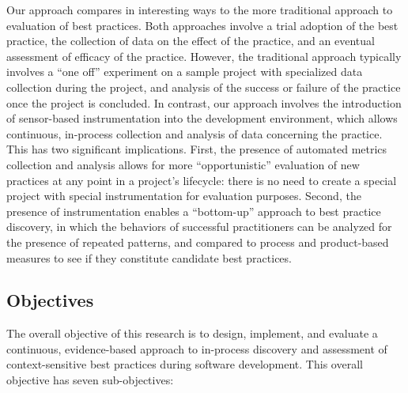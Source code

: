 Our approach compares in interesting ways to the more traditional approach
to evaluation of best practices.  Both approaches involve a trial adoption
of the best practice, the collection of data on the effect of the practice,
and an eventual assessment of efficacy of the practice. However, the
traditional approach typically involves a ``one off'' experiment on a
sample project with specialized data collection during the project, and
analysis of the success or failure of the practice once the project is
concluded.  In contrast, our approach involves the introduction of
sensor-based instrumentation into the development environment, which allows
continuous, in-process collection and analysis of data concerning the
practice.  This has two significant implications. First, the presence of
automated metrics collection and analysis allows for more ``opportunistic''
evaluation of new practices at any point in a project's lifecycle: there is
no need to create a special project with special instrumentation for
evaluation purposes. Second, the presence of instrumentation enables a
``bottom-up'' approach to best practice discovery, in which the behaviors
of successful practitioners can be analyzed for the presence of repeated
patterns, and compared to process and product-based measures to see if they
constitute candidate best practices.

\subsection{Objectives}
\label{sec:objectives}

The overall objective of this research is to design, implement, and
evaluate a continuous, evidence-based approach to in-process discovery and
assessment of context-sensitive best practices during software development.
This overall objective has seven sub-objectives:

